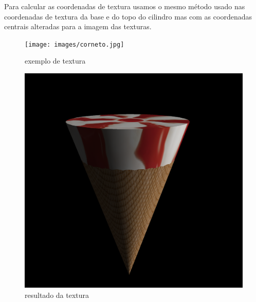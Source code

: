 \documentclass[a4paper]{report}
\begin{document}
Para calcular as coordenadas de textura usamos o mesmo método usado nas
coordenadas de textura da base e do topo do cilindro mas com as coordenadas
centrais alteradas para a imagem das texturas.\\
\begin{figure}[H]
    \centering
    \begin{minipage}{0.50\textwidth}
        \centering
        \texttt{[image: images/corneto.jpg]}
        \caption{exemplo de textura}
    \end{minipage}\hfill
    \begin{minipage}{0.49\textwidth}
        \centering
        \includegraphics[width=\textwidth]{images/corneto.png}
        \caption{resultado da textura}
    \end{minipage}\hfill
\end{figure}
\end{document}
